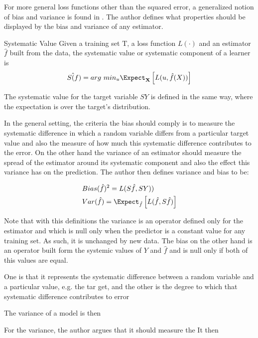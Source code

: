 For more general loss functions other than the squared error, a generalized notion of bias and variance is found in \cite{james-biasVarianceGeneral}. The author defines what properties should be displayed by the bias and variance of any estimator. 
 \begin{definition}{Systematic Value}
 	Given a training set $\mathrm{T}$, a loss function $L(\cdot)$ and an estimator $\hat{f}$ built from the data, the systematic value or systematic component of a learner is 
 	$$ S\hat(f)  =  arg \ min_u \Expect_{\textbf{X}} \left[ L(u,\hat{f}(X)) \right]$$
 \end{definition}
 
 The systematic value for the target variable $SY$ is defined in the same way, where the expectation is over the target's distribution. 
 
 In the general setting, the criteria the bias should comply is to measure the systematic difference in which a random variable differs from a particular target value and also the measure of how much this systematic difference contributes to the error. On the other hand the variance of an estimator should measure the spread of the estimator around its systematic component and also the effect this variance has on the prediction. The author then defines variance and bias to be:
 
 \begin{equation}
 \begin{split}
 & Bias(\hat{f})^2 = L(S\hat{f},SY)) \\
 & Var(\hat{f}) = \Expect_{\hat{f}} \left[  L(\hat{f}  , S\hat{f}) \right]
 \end{split}
 \end{equation}
 
 Note that with this definitions the variance is an operator defined only for the estimator and which is null only when the predictor is a constant value for any training set. As such, it is unchanged by new data. The bias on the other hand is an operator built form the systemic values of $Y$ and $\hat{f}$ and is null only if both of this values are equal.
 
 One is that it represents the systematic difference between a random
 variable and a particular value, e.g. the tar get, and the other is the degree
 to which that systematic difference contributes to error
 
 The variance of a model is then 
 
 For the variance, the author argues that it should measure the 
 It then 
 
